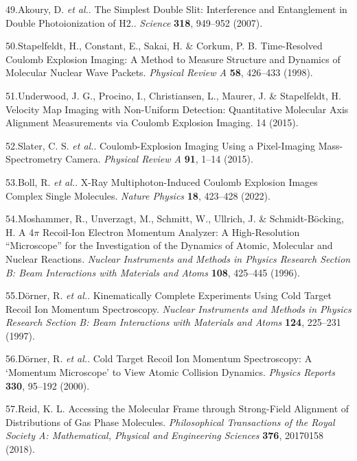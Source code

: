 \documentclass[10pt]{article}
\begin{document}
\label{csl:49}49.Akoury, D. \textit{et al.}. {The Simplest Double Slit: Interference and Entanglement in Double Photoionization of {{H2}}.}. \textit{Science} \textbf{318}, 949–952 (2007).

\label{csl:50}50.Stapelfeldt, H., Constant, E., Sakai, H. \& Corkum, P. B. {Time-Resolved {{Coulomb}} Explosion Imaging: {{A}} Method to Measure Structure and Dynamics of Molecular Nuclear Wave Packets}. \textit{Physical Review A} \textbf{58}, 426–433 (1998).

\label{csl:51}51.Underwood, J. G., Procino, I., Christiansen, L., Maurer, J. \& Stapelfeldt, H. {Velocity Map Imaging with Non-Uniform Detection: Quantitative Molecular Axis Alignment Measurements via {{Coulomb}} Explosion Imaging}. 14 (2015).

\label{csl:52}52.Slater, C. S. \textit{et al.}. {Coulomb-Explosion Imaging Using a Pixel-Imaging Mass-Spectrometry Camera}. \textit{Physical Review A} \textbf{91}, 1–14 (2015).

\label{csl:53}53.Boll, R. \textit{et al.}. {X-Ray Multiphoton-Induced {{Coulomb}} Explosion Images Complex Single Molecules}. \textit{Nature Physics} \textbf{18}, 423–428 (2022).

\label{csl:54}54.Moshammer, R., Unverzagt, M., Schmitt, W., Ullrich, J. \& {Schmidt-B{\"o}cking}, H. {A 4{$\pi$} Recoil-Ion Electron Momentum Analyzer: A High-Resolution ``Microscope'' for the Investigation of the Dynamics of Atomic, Molecular and Nuclear Reactions}. \textit{Nuclear Instruments and Methods in Physics Research Section B: Beam Interactions with Materials and Atoms} \textbf{108}, 425–445 (1996).

\label{csl:55}55.D{\"o}rner, R. \textit{et al.}. {Kinematically Complete Experiments Using Cold Target Recoil Ion Momentum Spectroscopy}. \textit{Nuclear Instruments and Methods in Physics Research Section B: Beam Interactions with Materials and Atoms} \textbf{124}, 225–231 (1997).

\label{csl:56}56.D{\"o}rner, R. \textit{et al.}. {Cold {{Target Recoil Ion Momentum Spectroscopy}}: A `Momentum Microscope' to View Atomic Collision Dynamics}. \textit{Physics Reports} \textbf{330}, 95–192 (2000).

\label{csl:57}57.Reid, K. L. {Accessing the Molecular Frame through Strong-Field Alignment of Distributions of Gas Phase Molecules}. \textit{Philosophical Transactions of the Royal Society A: Mathematical, Physical and Engineering Sciences} \textbf{376}, 20170158 (2018).
\end{document}
